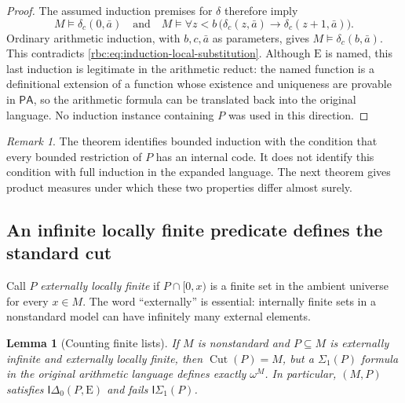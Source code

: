 \documentclass[11pt]{article}
\numberwithin{equation}{section}
\newtheorem{lemma}[theorem]{Lemma}
\theoremstyle{definition}
\theoremstyle{remark}
\newtheorem{remark}[theorem]{Remark}
\newcommand{\PA}{\mathsf{PA}}
\newcommand{\std}{\omega^M}
\newcommand{\E}{\mathrm E}
\newcommand{\Cut}{\operatorname{Cut}}
\begin{document}
\begin{proof}
The assumed induction premises for $\delta$ therefore imply
\[
 M\models\delta_c(0,\bar a)
 \quad\text{and}\quad
 M\models\forall z<b\,
       \bigl(\delta_c(z,\bar a)
                    \rightarrow\delta_c(z+1,\bar a)\bigr).
\]
Ordinary arithmetic induction, with $b,c,\bar a$ as parameters,
gives $M\models\delta_c(b,\bar a)$.  This contradicts
\eqref{rbc:eq:induction-local-substitution}.  Although $\E$ is named,
this last induction is legitimate in the arithmetic reduct:
the named function is a definitional extension of a function whose
existence and uniqueness are provable in $\PA$, so the arithmetic
formula can be translated back into the original language.
No induction instance containing $P$ was used in this direction.
\end{proof}

\begin{remark}
The theorem identifies bounded induction with the condition that
every bounded restriction of $P$ has an internal code.  It does not
identify this condition with full induction in the expanded language.
The next theorem gives product measures under which these two
properties differ almost surely.
\end{remark}

\subsection{An infinite locally finite predicate defines the standard cut}

Call $P$ \emph{externally locally finite} if
$P\cap[0,x)$ is a finite set in the ambient universe for every
$x\in M$.  The word ``externally'' is essential: internally finite
sets in a nonstandard model can have infinitely many external
elements.

\begin{lemma}[Counting finite lists]
\label{rbc:lem:induction-locally-finite}
If $M$ is nonstandard and $P\subseteq M$ is externally infinite and
externally locally finite, then $\Cut(P)=M$, but a
$\Sigma_1(P)$ formula in the original arithmetic language defines
exactly $\std$.  In particular, $(M,P)$ satisfies
$\mathsf{I}\Delta_0(P,\E)$ and fails
$\mathsf{I}\Sigma_1(P)$.
\end{lemma}
\end{document}
